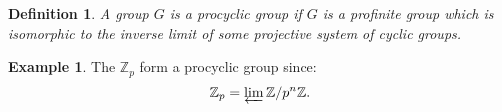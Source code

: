 \documentclass[12pt]{article}
\newtheorem*{defn}{Definition}
\theoremstyle{definition}
\newtheorem*{exa}{Example}
\newcommand{\Ints}{\mathbb{Z}}
\begin{document}
\begin{defn}
A group $G$ is a procyclic group if $G$ is a profinite group which is isomorphic to the inverse limit of some projective system of cyclic groups. 
\end{defn}

\begin{exa}
The  $\Ints_p$ form a procyclic group since:
$$\Ints_p=\varprojlim \Ints/p^n\Ints.$$
\end{exa}
\end{document}

